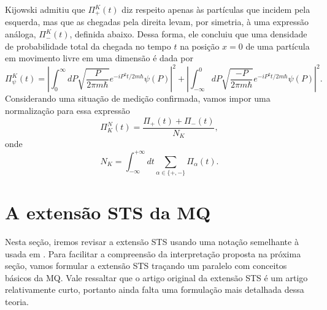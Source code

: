 Kijowski admitiu que $\Pi_{+}^K(t)$ diz respeito apenas às partículas que incidem pela esquerda, mas que as chegadas pela direita levam, por simetria, à uma expressão análoga, $\Pi_{-}^K(t)$, definida abaixo. Dessa forma, ele concluiu que uma densidade de probabilidade total da chegada no tempo $t$ na posição $x = 0$ de uma partícula em movimento livre em uma dimensão é dada por
\begin{equation}\label{eqK1}
\Pi_\psi^K(t)=\left|\int_0^{\infty} d P \sqrt{\frac{P}{2 \pi m \hbar}} e^{-i P^2 t / 2 m \hbar} \psi(P)\right|^2+\left|\int_{-\infty}^0 d P \sqrt{\frac{-P}{2 \pi m \hbar}} e^{-i P^2 t / 2 m \hbar} \psi(P)\right|^2 .
\end{equation}
Considerando uma situação de medição confirmada, vamos impor uma normalização para essa expressão
\begin{equation}\label{eqK2}
\Pi_{K}^{N} (t) = \frac{\Pi_{+} (t) + \Pi_{-} (t)}{N_{K}},
\end{equation}
onde
\begin{equation}\label{eqK3}
N_{K} = \int_{-\infty}^{+\infty} dt \sum_{\alpha \in \{+,-\}} \Pi_{\alpha} (t).
\end{equation}





\section{A extensão STS da MQ}
\label{sec:stsreview}

Nesta seção, iremos revisar a extensão STS usando uma notação semelhante à usada em \cite{Parana}. Para facilitar a compreensão da interpretação proposta na próxima seção, vamos formular a extensão STS traçando um paralelo com conceitos básicos da MQ. Vale ressaltar que o artigo original da extensão STS \cite{Dias} é um artigo relativamente curto, portanto ainda falta uma formulação mais detalhada dessa teoria.




